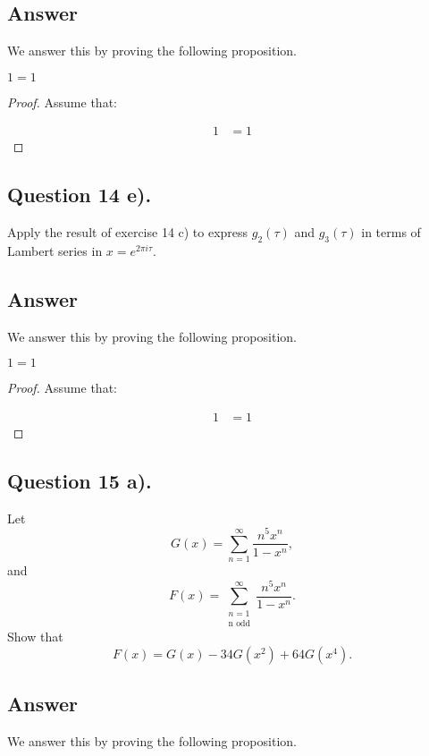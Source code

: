 \subsection*{Answer}
\noindent
We answer this by proving the following proposition.

\begin{proposition}
    $1=1$
\end{proposition}

\begin{proof}
    Assume that:

    \begin{align*}
        1 &= 1
    \end{align*}

\end{proof}


\subsection{Question 14 e).}
\noindent
Apply the result of exercise 14 c) to express $g_2(\tau)$ and $g_3(\tau)$ in terms of Lambert series in
$x=e^{2\pi i \tau}$.

\subsection*{Answer}
\noindent
We answer this by proving the following proposition.

\begin{proposition}
    $1=1$
\end{proposition}

\begin{proof}
    Assume that:

    \begin{align*}
        1 &= 1
    \end{align*}

\end{proof}


\subsection{Question 15 a).}
\noindent
Let
\[
    G(x)=\sum_{n=1}^{\infty} \frac{n^5 x^n}{1-x^n},
\]
and
\[
    F(x)=\sum_{\substack{n=1\\ \text{n odd}}}^{\infty} \frac{n^5 x^n}{1-x^n}.
\]
Show that
\[
    F(x)=G(x)-34G(x^2)+64G(x^4).
\]

\subsection*{Answer}
\noindent
We answer this by proving the following proposition.


